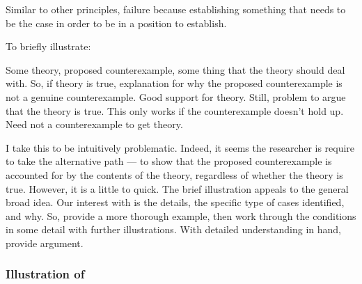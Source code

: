 \begin{note}
  Similar to other principles, failure because establishing something that needs to be the case in order to be in a position to establish.

  To briefly illustrate:

  Some theory, proposed counterexample, some thing that the theory should deal with.
  So, if theory is true, explanation for why the proposed counterexample is not a genuine counterexample.
  Good support for theory.
  Still, problem to argue that the theory is true.
  This only works if the counterexample doesn't hold up.
  Need not a counterexample to get theory.

  I take this to be intuitively problematic.
  Indeed, it seems the researcher is require to take the alternative path --- to show that the proposed counterexample is accounted for by the contents of the theory, regardless of whether the theory is true.
  However, it is a little to quick.
  The brief illustration appeals to the general broad idea.
  Our interest with \nI{} is the details, the specific type of cases identified, and why.
  So, provide a more thorough example, then work through the conditions in some detail with further illustrations.
  With detailed understanding in hand, provide argument.
\end{note}

\subsubsection{Illustration of \nI{}}
\label{sec:illustration-ni}

